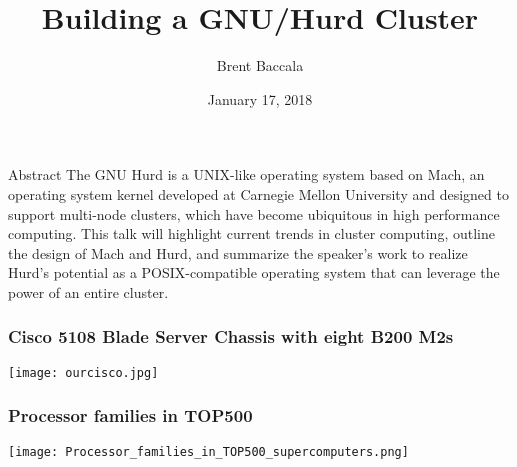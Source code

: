 \documentclass{beamer}
\title{Building a GNU/Hurd Cluster}
\author{Brent Baccala}
\institute{\tt cosine@freesoft.org}
\date{January 17, 2018}
\begin{document}
\begin{frame}
\titlepage
\begin{block}{Abstract}
The GNU Hurd is a UNIX-like operating system based on Mach, an
operating system kernel developed at Carnegie Mellon University and
designed to support multi-node clusters, which have become ubiquitous
in high performance computing.  This talk will highlight current
trends in cluster computing, outline the design of Mach and Hurd, and
summarize the speaker's work to realize Hurd's potential as a
POSIX-compatible operating system that can leverage the power of an
entire cluster.
\end{block}
\end{frame}

\begin{frame}
\frametitle{Cisco 5108 Blade Server Chassis with eight B200 M2s}
\texttt{[image: ourcisco.jpg]}
\end{frame}

\begin{frame}
\frametitle{Processor families in TOP500}
\texttt{[image: Processor\_families\_in\_TOP500\_supercomputers.png]}
\end{frame}

\newcommand\topfh[7]{
#1 & #2 & #3 & #4 & #6 & #7 \\
& \multicolumn{4}{l}{\hskip 1cm #5} \\
\\
}
\end{document}
